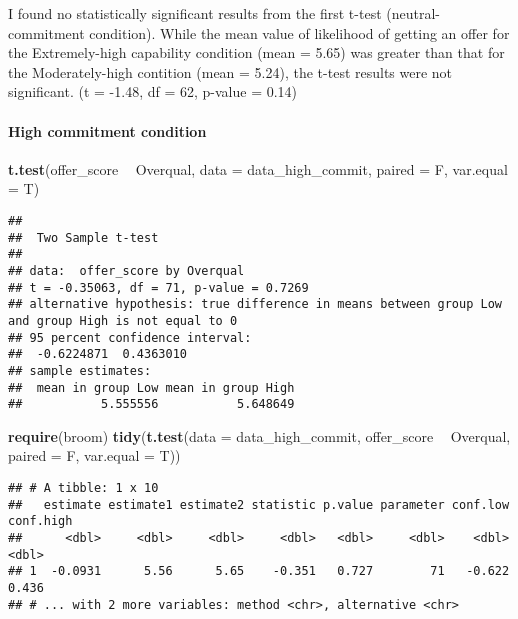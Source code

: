 \documentclass[]{article}
\newenvironment{Shaded}{\begin{snugshade}}{\end{snugshade}}
\newcommand{\DataTypeTok}[1]{\textcolor[rgb]{0.13,0.29,0.53}{#1}}
\newcommand{\KeywordTok}[1]{\textcolor[rgb]{0.13,0.29,0.53}{\textbf{#1}}}
\newcommand{\NormalTok}[1]{#1}
\newcommand{\OperatorTok}[1]{\textcolor[rgb]{0.81,0.36,0.00}{\textbf{#1}}}
\newcommand{\StringTok}[1]{\textcolor[rgb]{0.31,0.60,0.02}{#1}}
\let\oldparagraph\paragraph
\renewcommand{\paragraph}[1]{\oldparagraph{#1}\mbox{}}
\begin{document}
I found no statistically significant results from the first t-test
(neutral-commitment condition). While the mean value of likelihood of
getting an offer for the Extremely-high capability condition (mean =
5.65) was greater than that for the Moderately-high contition (mean =
5.24), the t-test results were not significant. (t = -1.48, df = 62,
p-value = 0.14)

\hypertarget{high-commitment-condition}{%
\paragraph{High commitment condition}\label{high-commitment-condition}}

\begin{Shaded}
\begin{Highlighting}[]
\KeywordTok{t.test}\NormalTok{(offer_score }\OperatorTok{~}\StringTok{ }\NormalTok{Overqual, }\DataTypeTok{data =}\NormalTok{ data_high_commit, }\DataTypeTok{paired =}\NormalTok{ F, }\DataTypeTok{var.equal =}\NormalTok{ T)}
\end{Highlighting}
\end{Shaded}

\begin{verbatim}
## 
##  Two Sample t-test
## 
## data:  offer_score by Overqual
## t = -0.35063, df = 71, p-value = 0.7269
## alternative hypothesis: true difference in means between group Low and group High is not equal to 0
## 95 percent confidence interval:
##  -0.6224871  0.4363010
## sample estimates:
##  mean in group Low mean in group High 
##           5.555556           5.648649
\end{verbatim}

\begin{Shaded}
\begin{Highlighting}[]
\KeywordTok{require}\NormalTok{(broom)}
\KeywordTok{tidy}\NormalTok{(}\KeywordTok{t.test}\NormalTok{(}\DataTypeTok{data =}\NormalTok{ data_high_commit, offer_score }\OperatorTok{~}\StringTok{ }\NormalTok{Overqual, }\DataTypeTok{paired =}\NormalTok{ F, }\DataTypeTok{var.equal =}\NormalTok{ T))}
\end{Highlighting}
\end{Shaded}

\begin{verbatim}
## # A tibble: 1 x 10
##   estimate estimate1 estimate2 statistic p.value parameter conf.low conf.high
##      <dbl>     <dbl>     <dbl>     <dbl>   <dbl>     <dbl>    <dbl>     <dbl>
## 1  -0.0931      5.56      5.65    -0.351   0.727        71   -0.622     0.436
## # ... with 2 more variables: method <chr>, alternative <chr>
\end{verbatim}
\end{document}
